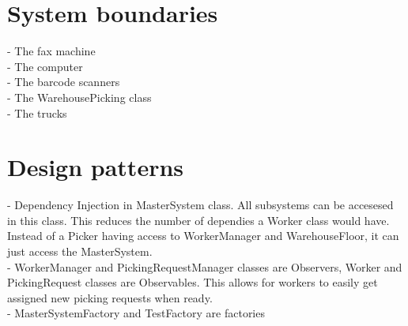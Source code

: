 \documentclass[12pt]{article}
\begin{document}
\section*{System boundaries}
    - The fax machine\\
    - The computer\\
    - The barcode scanners\\
    - The WarehousePicking class\\
    - The trucks
\pagebreak
\section*{Design patterns}
- Dependency Injection in MasterSystem class. All subsystems can be accesesed in this class. This reduces the number of dependies a Worker class would have. Instead of a Picker having access to WorkerManager and WarehouseFloor, it can just access the MasterSystem.\\
- WorkerManager and PickingRequestManager classes are Observers, Worker and PickingRequest classes are Observables. This allows for workers to easily get assigned new picking requests when ready.\\
- MasterSystemFactory and TestFactory are factories\\
\pagebreak
\end{document}
